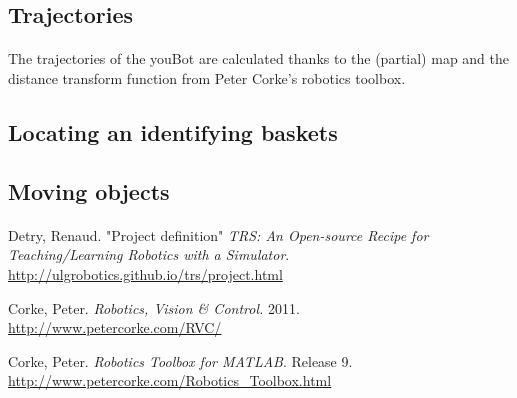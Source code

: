 \documentclass[12pt,a4paper]{article}
\begin{document}
\subsection{Trajectories}

\paragraph{}
The trajectories of the youBot are calculated thanks to the (partial) map and the distance transform function from Peter Corke's robotics toolbox\cite{CorkeRTB}. 

\subsection{Locating an identifying baskets}

\paragraph{}


\subsection{Moving objects}

\paragraph{} 




\clearpage
\begin{thebibliography}{9}

Detry, Renaud. "Project definition" \textit{TRS: An Open-source Recipe for Teaching/Learning Robotics with a Simulator}. \\
\url{http://ulgrobotics.github.io/trs/project.html}

Corke, Peter. \textit{Robotics, Vision \& Control.} 2011.\\
\url{http://www.petercorke.com/RVC/}

Corke, Peter. \textit{Robotics Toolbox for MATLAB}. Release 9. \\
\url{http://www.petercorke.com/Robotics_Toolbox.html}




\end{thebibliography}
\end{document}
